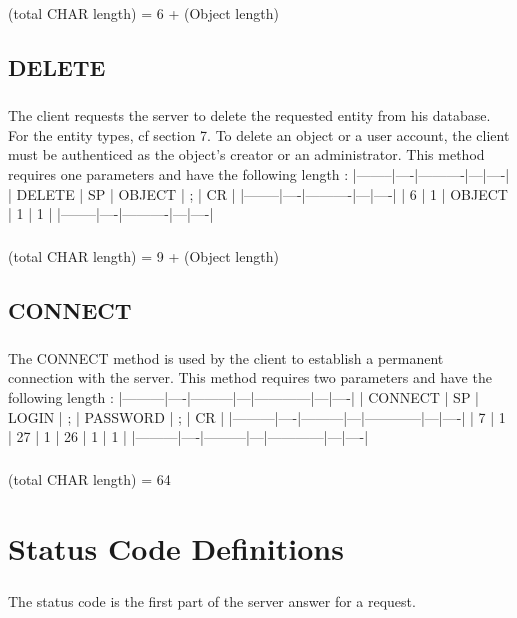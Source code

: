         \paragraph{}
(total CHAR length) = 6
+ ({Object} length)
    \section{DELETE}
        \paragraph{}
The client requests the server to delete the requested entity from
his database. For the entity types, cf section 7. To delete an
object or a user account, the client must be authenticed as the
object's creator or an administrator.
This method requires one parameters and have the following length :
|--------|----|----------|---|----|
| DELETE | SP | {OBJECT} | ; | CR |
|--------|----|----------|---|----|
|    6   |  1 | {OBJECT} | 1 |  1 |
|--------|----|----------|---|----|
        \paragraph{}
(total CHAR length) = 9
+ ({Object} length)
    \section{CONNECT}
        \paragraph{}
The CONNECT method is used by the client to establish a permanent
connection with the server.
This method requires two parameters and have the following length :
|---------|----|---------|---|------------|---|----|
| CONNECT | SP | {LOGIN} | ; | {PASSWORD} | ; | CR |
|---------|----|---------|---|------------|---|----|
|    7    |  1 |    27   | 1 |     26     | 1 |  1 |
|---------|----|---------|---|------------|---|----|
        \paragraph{}
(total CHAR length) = 64


    \clearpage
\chapter{Status Code Definitions}
        \paragraph{}
The status code is the first part of the server answer for a request.
